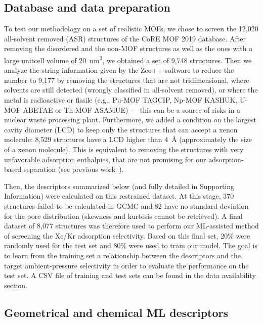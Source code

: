 \documentclass[main]{subfiles}
\begin{document}
\subsection{Database and data preparation}

To test our methodology on a set of realistic MOFs, we chose to screen the 12,020 all-solvent removed (ASR) structures of the CoRE MOF 2019 database\cite{Chung_2019}. After removing the disordered and the non-MOF structures as well as the ones with a large unitcell volume of \SI{20}{\cubic\nano\meter}, we obtained a set of 9,748 structures. Then we analyze the string information given by the Zeo++ software\cite{zeopp_Willems2012} to reduce the number to 9,177 by removing the structures that are not tridimensional, where solvents are still detected (wrongly classified in all-solvent removed), or where the metal is radioactive or fissile (e.g., Pu-MOF TAGCIP\cite{Diwu_2010}, Np-MOF KASHUK\cite{Martin_2017}, U-MOF ABETAE\cite{Jouffret_2011} or Th-MOF ASAMUE\cite{Liang_2016}) --- this can be a source of risks in a nuclear waste processing plant. Furthermore, we added a condition on the largest cavity diameter (LCD) to keep only the structures that can accept a xenon molecule: 8,529 structures have a LCD higher than \SI{4}{\angstrom} (approximately the size of a xenon molecule). This is equivalent to removing the structures with very unfavorable adsorption enthalpies, that are not promising for our adsorption-based separation (see previous work~\cite{Ren_2023}).

Then, the descriptors summarized below (and fully detailed in Supporting Information) were calculated on this restrained dataset. At this stage, 370 structures failed to be calculated in GCMC and 82 have no standard deviation for the pore distribution (skewness and kurtosis cannot be retrieved). A final dataset of 8,077 structures was therefore used to perform our ML-assisted method of screening the Xe/Kr adsorption selectivity. Based on this final set, {20\%} were randomly used for the test set and {80\%} were used to train our model. The goal is to learn from the training set a relationship between the descriptors and the target ambient-pressure selectivity in order to evaluate the performance on the test set. A CSV file of training and test sets can be found in the data availability section.

\subsection{Geometrical and chemical ML descriptors}
\end{document}
